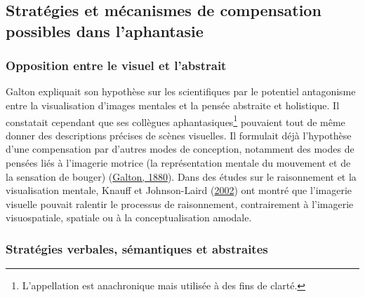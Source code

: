 \documentclass[
  12pt,
]{article}
\begin{document}
\hypertarget{stratuxe9gies-et-muxe9canismes-de-compensation-possibles-dans-laphantasie}{%
\subsection{Stratégies et mécanismes de compensation possibles dans
l'aphantasie}\label{stratuxe9gies-et-muxe9canismes-de-compensation-possibles-dans-laphantasie}}

\hypertarget{opposition-entre-le-visuel-et-labstrait}{%
\subsubsection{Opposition entre le visuel et
l'abstrait}\label{opposition-entre-le-visuel-et-labstrait}}

Galton expliquait son hypothèse sur les scientifiques par le potentiel
antagonisme entre la visualisation d'images mentales et la pensée
abstraite et holistique. Il constatait cependant que ses collègues
aphantasiques\footnote{L'appellation est anachronique mais utilisée à
  des fins de clarté.} pouvaient tout de même donner des descriptions
précises de scènes visuelles. Il formulait déjà l'hypothèse d'une
compensation par d'autres modes de conception, notamment des modes de
pensées liés à l'imagerie motrice (la représentation mentale du
mouvement et de la sensation de bouger)
(\protect\hyperlink{ref-galtonSTATISTICSMENTALIMAGERY1880}{Galton,
1880}). Dans des études sur le raisonnement et la visualisation mentale,
Knauff et Johnson-Laird
(\protect\hyperlink{ref-knauffVisualImageryCan2002}{2002}) ont montré
que l'imagerie visuelle pouvait ralentir le processus de raisonnement,
contrairement à l'imagerie visuospatiale, spatiale ou à la
conceptualisation amodale.

\hypertarget{stratuxe9gies-verbales-suxe9mantiques-et-abstraites}{%
\subsubsection{Stratégies verbales, sémantiques et
abstraites}\label{stratuxe9gies-verbales-suxe9mantiques-et-abstraites}}
\end{document}
